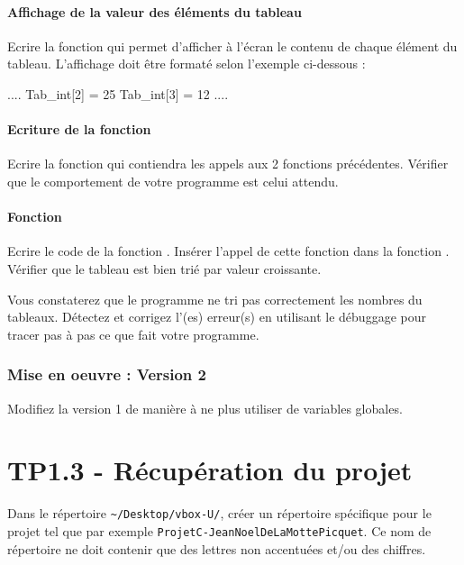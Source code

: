 \subsubsection{Affichage de la valeur des éléments du tableau }

Ecrire la fonction  qui permet d'afficher à
l'écran le contenu de chaque élément du tableau. L'affichage doit être formaté
selon l'exemple ci-dessous :
\begin{csource}
    ....
    Tab_int[2] = 25
    Tab_int[3] = 12
    ....
\end{csource}

\subsubsection{Ecriture de la fonction }

Ecrire la fonction  qui contiendra les appels aux 2 fonctions
précédentes. Vérifier que le comportement de votre programme est celui attendu.

\subsubsection{Fonction }

Ecrire le code de la fonction . Insérer l'appel de cette
fonction dans la fonction . Vérifier que le tableau est bien trié
par valeur croissante.

\begin{commonerrors}
Vous constaterez que le programme ne tri pas correctement les nombres du tableaux. Détectez et corrigez l'(es) erreur(s) en utilisant le débuggage pour tracer pas à pas ce que fait votre programme.
\end{commonerrors}

\subsection{Mise en oeuvre : Version 2}

Modifiez la version 1 de manière à ne plus utiliser de variables globales.
    
 
\chapter{TP1.3 - Récupération du projet}

Dans le répertoire \verb|~/Desktop/vbox-U/|, créer un répertoire spécifique pour le projet tel que par exemple \verb'ProjetC-JeanNoelDeLaMottePicquet'.
Ce nom de répertoire ne doit contenir que des lettres non accentuées et/ou des chiffres.
  
